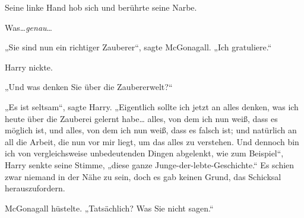 Seine linke Hand hob sich und berührte seine Narbe.

Was…\emph{genau}…

„Sie sind nun ein richtiger Zauberer“, sagte McGonagall. „Ich gratuliere.“

Harry nickte.

„Und was denken Sie über die Zaubererwelt?“

„Es ist seltsam“, sagte Harry. „Eigentlich sollte ich jetzt an alles denken, was ich heute über die Zauberei gelernt habe… alles, von dem ich nun weiß, dass es möglich ist, und alles, von dem ich nun weiß, dass es falsch ist; und natürlich an all die Arbeit, die nun vor mir liegt, um das alles zu verstehen. Und dennoch bin ich von vergleichsweise unbedeutenden Dingen abgelenkt, wie zum Beispiel“, Harry senkte seine Stimme, „diese ganze Junge-der-lebte-Geschichte.“ Es schien zwar niemand in der Nähe zu sein, doch es gab keinen Grund, das Schicksal herauszufordern.

McGonagall hüstelte. „Tatsächlich? Was Sie nicht sagen.“

